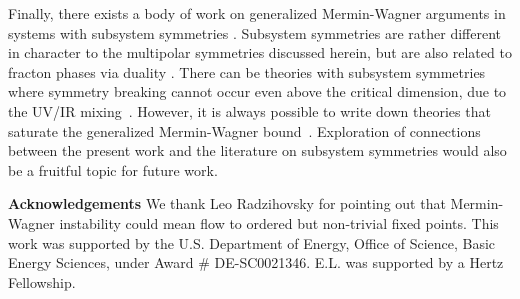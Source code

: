 \documentclass[prb,aps,twocolumn, amsfonts,amsmath,amssymb,nofootinbib,superscriptaddress]{revtex4-2}
\begin{document}
Finally, there exists a body of work on generalized Mermin-Wagner arguments in systems with subsystem symmetries \cite{Batista2005, SeibergA, SeibergB, SeibergC, Gorantla2021, Distler2021}. Subsystem symmetries are rather different in character to the multipolar symmetries discussed herein, but are also related to fracton phases via duality \cite{VHF2}. There can be theories with subsystem symmetries where symmetry breaking cannot occur even above the critical dimension, due to the UV/IR mixing~\cite{Gorantla2021}. However, it is always possible to write down theories that saturate the generalized Mermin-Wagner bound~\cite{Distler2021}.
Exploration of connections between the present work and the literature on subsystem symmetries would also be a fruitful topic for future work. 

{\bf Acknowledgements} We thank Leo Radzihovsky for pointing out that Mermin-Wagner instability could mean flow to ordered but non-trivial fixed points. This work was supported by
the U.S. Department of Energy, Office of Science, Basic Energy Sciences, under Award \# DE-SC0021346. E.L. was supported by a Hertz Fellowship. 


\end{document}
